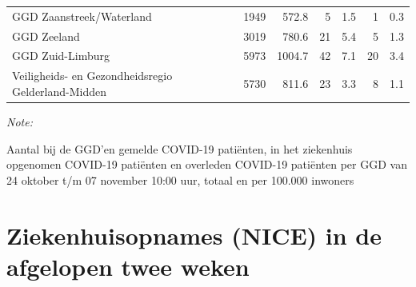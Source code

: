 \documentclass[
  english,
  man,floatsintext]{apa6}
\begin{document}
\begin{table}
\begin{threeparttable}
\begin{tabular}{lrrrrrr}
GGD Zaanstreek/Waterland & 1949 & 572.8 & 5 & 1.5 & 1 & 0.3\\
GGD Zeeland & 3019 & 780.6 & 21 & 5.4 & 5 & 1.3\\
GGD Zuid-Limburg & 5973 & 1004.7 & 42 & 7.1 & 20 & 3.4\\
Veiligheids- en Gezondheidsregio Gelderland-Midden & 5730 & 811.6 & 23 & 3.3 & 8 & 1.1\\
\bottomrule
\end{tabular}
\begin{tablenotes}
\item \textit{Note: } 
\item Aantal bij de GGD’en gemelde COVID-19 patiënten, in het ziekenhuis opgenomen COVID-19 patiënten en overleden COVID-19 patiënten per GGD van 24 oktober t/m 07 november 10:00 uur, totaal en per 100.000 inwoners
\end{tablenotes}
\end{threeparttable}
\endgroup{}
\end{table}

\newpage

\hypertarget{ziekenhuisopnames-nice-in-de-afgelopen-twee-weken}{%
\section{Ziekenhuisopnames (NICE) in de afgelopen twee weken}\label{ziekenhuisopnames-nice-in-de-afgelopen-twee-weken}}
\end{document}
